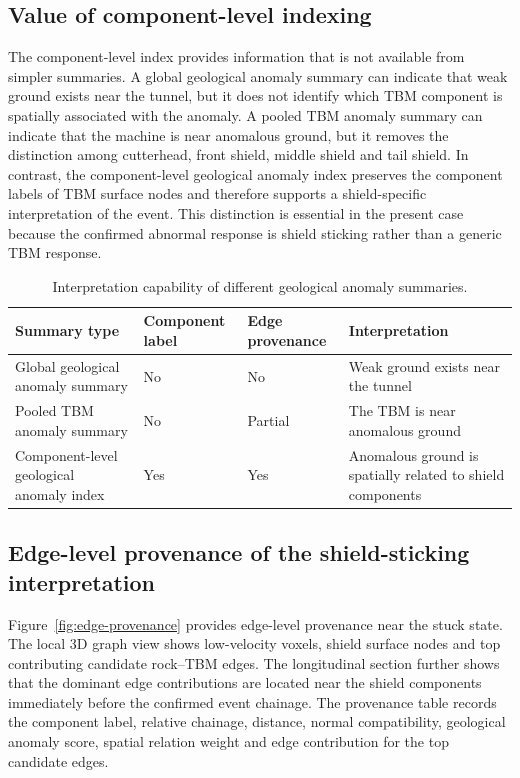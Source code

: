 \FloatBarrier

\subsection{Value of component-level indexing}
\label{sec:result-component-indexing}

The component-level index provides information that is not available from simpler summaries. A global geological anomaly summary can indicate that weak ground exists near the tunnel, but it does not identify which TBM component is spatially associated with the anomaly. A pooled TBM anomaly summary can indicate that the machine is near anomalous ground, but it removes the distinction among cutterhead, front shield, middle shield and tail shield. In contrast, the component-level geological anomaly index preserves the component labels of TBM surface nodes and therefore supports a shield-specific interpretation of the event. This distinction is essential in the present case because the confirmed abnormal response is shield sticking rather than a generic TBM response.

\begin{table}[!ht]
\centering
\caption{Interpretation capability of different geological anomaly summaries.}
\label{tab:summary-comparison}
\begin{tabular}{p{}p{}p{}p{}}
\toprule
Summary type & Component label & Edge provenance & Interpretation \\
\midrule
Global geological anomaly summary & No & No & Weak ground exists near the tunnel \\
Pooled TBM anomaly summary & No & Partial & The TBM is near anomalous ground \\
Component-level geological anomaly index & Yes & Yes & Anomalous ground is spatially related to shield components \\
\bottomrule
\end{tabular}
\end{table}

\FloatBarrier

\subsection{Edge-level provenance of the shield-sticking interpretation}
\label{sec:result-provenance}

Figure~\ref{fig:edge-provenance} provides edge-level provenance near the stuck state. The local 3D graph view shows low-velocity voxels, shield surface nodes and top contributing candidate rock--TBM edges. The longitudinal section further shows that the dominant edge contributions are located near the shield components immediately before the confirmed event chainage. The provenance table records the component label, relative chainage, distance, normal compatibility, geological anomaly score, spatial relation weight and edge contribution for the top candidate edges.

